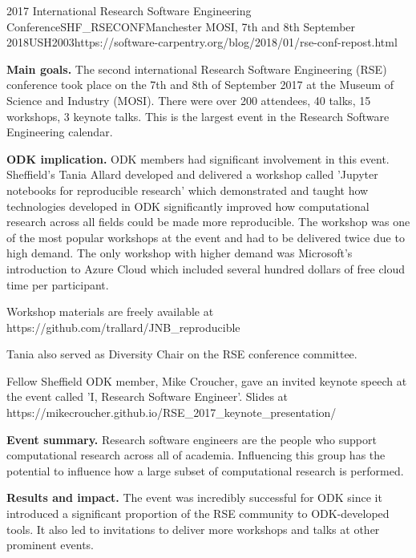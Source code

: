 \begin{event}{2017 International Research Software Engineering Conference}{SHF_RSECONF}{Manchester MOSI, 7th and 8th September 2018}{USH}{200}{3}{https://software-carpentry.org/blog/2018/01/rse-conf-repost.html}

\textbf{Main goals.} The second international Research Software Engineering (RSE) conference took place on the 7th and 8th of September 2017 at the Museum of Science and Industry (MOSI). There were over 200 attendees, 40 talks, 15 workshops, 3 keynote talks. This is the largest event in the Research Software Engineering calendar.

\textbf{ODK implication.} ODK members had significant involvement in this event. Sheffield's Tania Allard developed and delivered a workshop called 'Jupyter notebooks for reproducible research’ which demonstrated and taught how technologies developed in ODK significantly improved how computational research across all fields could be made more reproducible.  The workshop was one of the most popular workshops at the event and had to be delivered twice due to high demand. The only workshop with higher demand was Microsoft's introduction to Azure Cloud which included several hundred dollars of free cloud time per participant.

Workshop materials are freely available at https://github.com/trallard/JNB_reproducible

Tania also served as Diversity Chair on the RSE conference committee.

Fellow Sheffield ODK member, Mike Croucher, gave an invited keynote speech at the event called 'I, Research Software Engineer'. Slides at https://mikecroucher.github.io/RSE_2017_keynote_presentation/

\textbf{Event summary.} Research software engineers are the people who support computational research across all of academia. Influencing this group has the potential to influence how a large subset of computational research is performed. 

\textbf{Results and impact.} The event was incredibly successful for ODK since it introduced a significant proportion of the RSE community to ODK-developed tools.  It also led to invitations to deliver more workshops and talks at other prominent events.

\end{event}
